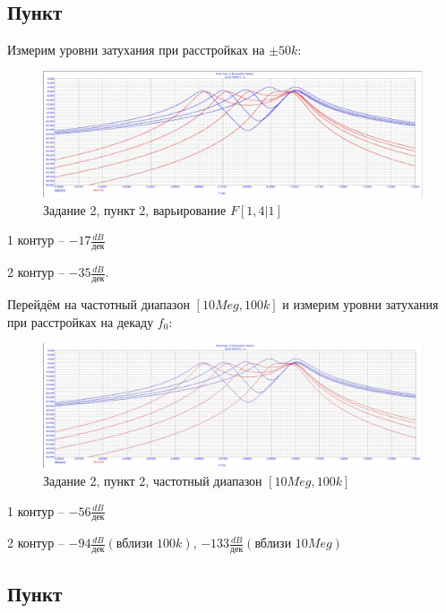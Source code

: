 \documentclass[a4paper, 14pt]{extarticle}%
\begin{document}
~

\subsection{Пункт}

Измерим уровни затухания при расстройках на $\pm 50k$:

\begin{figure}[h!]
	\centering
			\includegraphics[width=1.1\linewidth]{2.2_varF.jpg}
            \caption{Задание 2,  пункт 2, варьирование $F  [1,4|1]$}
	\label{A}
\end{figure}

1 контур -- $-17 \frac{dB}{\text{дек}}$

2 контур -- $-35 \frac{dB}{\text{дек}}$.

Перейдём на частотный диапазон $[10Meg,100k]$ и измерим уровни затухания при расстройках на декаду $f_0$:

\begin{figure}[h!]
	\centering
			\includegraphics[width=1.1\linewidth]{2.2_freq_range.jpg}
            \caption{Задание 2,  пункт 2, частотный диапазон $[10Meg, 100k]$}
	\label{A}
\end{figure}

1 контур -- $-56\frac{dB}{\text{дек}}$

2 контур -- $-94\frac{dB}{\text{дек}}(\text{вблизи $100k$})$, $-133\frac{dB}{\text{дек}}(\text{вблизи $10Meg$})$



\subsection{Пункт}
\end{document}
